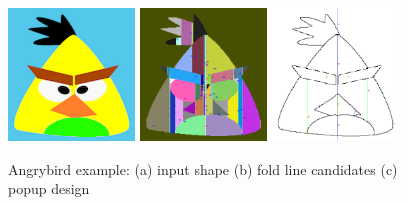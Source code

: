 \begin{figure}[h]
  \includegraphics[width = 0.3\textwidth]{Figures/angrybird/angrybird}
  \includegraphics[width = 0.3\textwidth]{Figures/angrybird/popup_graph}
  \includegraphics[width = 0.3\textwidth]{Figures/angrybird/optimized_popup_graph}
  \caption{Angrybird example: (a) input shape (b) fold line candidates (c) popup design}
  \label{fig:stable}
\end{figure}
